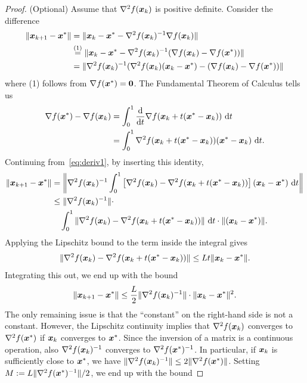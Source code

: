 \begin{proof}(Optional)
Assume that $\nabla^2f(\bm{x}_k)$ is positive definite.
 Consider the difference
 \begin{align}\label{eq:deriv1}
 \begin{split}
  \Vert {\bm{x}_{k+1}-\bm{x}^*}\Vert & = \Vert {\bm{x}_{k}-\bm{x}^*-\nabla^2f(\bm{x}_k)^{-1}\nabla f(\bm{x}_k)}\Vert\\
  &\stackrel{(1)}{=} \Vert {\bm{x}_{k}-\bm{x}^*-\nabla^2f(\bm{x}_k)^{-1}(\nabla f(\bm{x}_k)-\nabla f(\bm{x}^*))}\Vert\\
  &=  \Vert {\nabla^2f(\bm{x}_k)^{-1}(\nabla^2f(\bm{x}_k)(\bm{x}_{k}-\bm{x}^*)-(\nabla f(\bm{x}_k)-\nabla f(\bm{x}^*))}\Vert
  \end{split}
  \end{align}
where (1) follows from $\nabla f(\bm{x}^*)=\bm{0}$.
The Fundamental Theorem of Calculus tells us
\begin{align*}
 \nabla f(\vct{x}^*)-\nabla f(\vct{x}_k) &= \int_{0}^1 \frac{\diff{}}{\diff{t}} \nabla f(\vct{x}_k+t(\vct{x}^*-\vct{x}_k)) \ \diff{t}\\
 &= \int_{0}^1 \nabla^2 f(\vct{x}_k+t(\vct{x}^*-\vct{x}_k))(\vct{x}^*-\vct{x}_k) \ \diff{t}.
\end{align*}
Continuing from~\eqref{eq:deriv1}, by inserting this identity,
\begin{align*}
 \Vert {\bm{x}_{k+1}-\bm{x}^*}\Vert &= \left\|\nabla^2f(\bm{x}_k)^{-1}\int_{0}^1\left[\nabla^2f(\bm{x}_k)- \nabla^2 f(\bm{x}_k+t(\bm{x}^*-\bm{x}_k))\right](\bm{x}_k-\bm{x}^*) \ \mathrm{d}{t}\right\|\\
 &\leq \Vert {\nabla^2f(\bm{x}_k)^{-1}}\Vert\cdot \\
 & \quad \int_{0}^1\Vert {\nabla^2f(\bm{x}_k)- \nabla^2 f(\bm{x}_k+t(\bm{x}^*-\bm{x}_k))}\Vert\ \mathrm{d}{t} \cdot \Vert {(\bm{x}_k-\bm{x}^*)}\Vert.
\end{align*}
Applying the Lipschitz bound to the term inside the integral gives
\begin{equation*}
 \Vert {\nabla^2f(\bm{x}_k)- \nabla^2 f(\bm{x}_k+t(\bm{x}^*-\bm{x}_k))}\Vert \leq L t\Vert {\bm{x}_k-\bm{x}^*}\Vert.
\end{equation*}
Integrating this out, we end up with the bound
\begin{equation*}
 \Vert {\bm{x}_{k+1}-\bm{x}^*}\Vert \leq \frac{L}{2}\Vert {\nabla^2f(\bm{x}_k)^{-1}}\Vert\cdot \Vert {\bm{x}_k-\bm{x}^*}\Vert^2.
\end{equation*}
The only remaining issue is that the ``constant'' on the right-hand side is not a constant. However, the Lipschitz continuity implies that $\nabla^2f(\bm{x}_k)$ converges to $\nabla^2f(\bm{x}^*)$ if $\bm{x}_k$ converges to $\bm{x}^*$. Since the inversion of a matrix is a continuous operation, also $\nabla^2f(\bm{x}_k)^{-1}$ converges to $\nabla^2 f(\bm{x}^*)^{-1}$. In particular, if $\bm{x}_k$ is sufficiently close to $\bm{x}^*$, we have $\Vert {\nabla^2f(\bm{x}_k)^{-1}}\Vert\leq 2\Vert {\nabla^2f(\bm{x}^*)}\Vert$. Setting $M:=L\Vert {\nabla^2f(\bm{x}^*)^{-1}}\Vert/2$, we end up with the bound

\end{proof}
